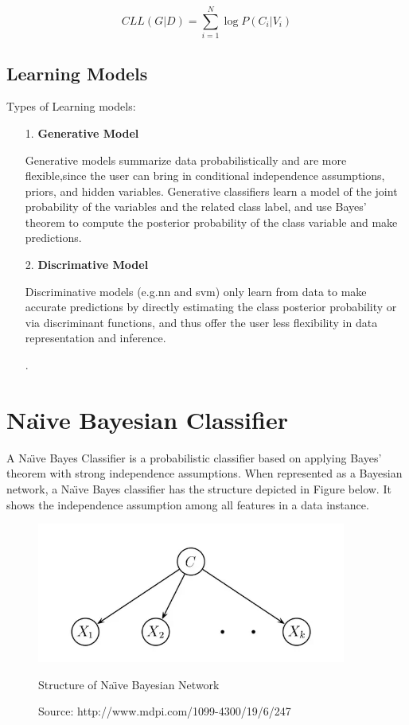 \[CLL (G|D)=\sum_{i=1}^{N}\log P(C_i|V_i) \]
\newpage
\par
\subsection{Learning Models}
\par 
Types of Learning models:
\begin{enumerate}
\item[1.] \textbf{Generative Model}
\par
Generative models summarize data probabilistically and are more flexible,since the user can bring in conditional independence assumptions, priors, and hidden variables. Generative classifiers learn a model of the joint probability of the variables and the related class label, and use Bayes’ theorem to compute the posterior probability of the class variable and make predictions. 

\item[2.] \textbf{Discrimative Model}
\par
Discriminative models (e.g.\acs{nn} and \acs{svm}) only learn from data to make accurate predictions by directly estimating the class posterior probability or via discriminant functions, and thus offer the user less flexibility in data representation and inference.
\item[.] 
\end{enumerate}
\section{Na\"{\i}ve Bayesian Classifier}

\par
A Na\"{\i}ve Bayes Classifier is a probabilistic classifier based on applying Bayes’ theorem with strong independence  assumptions. When represented as a Bayesian network, a Na\"{\i}ve Bayes classifier has the structure depicted in Figure below.  \cite{friedman1997bayesian} It shows the independence assumption among all features in a data instance.
\begin{figure}[bh] %
\begin{small}

	\includegraphics[width=4in]{images/naivebayesian.jpg}
	\caption{Structure of Na\"{\i}ve Bayesian Network} %
	\caption*{Source:   http://www.mdpi.com/1099-4300/19/6/247}
	\label{NB} %
\end{small}
\end{figure}

